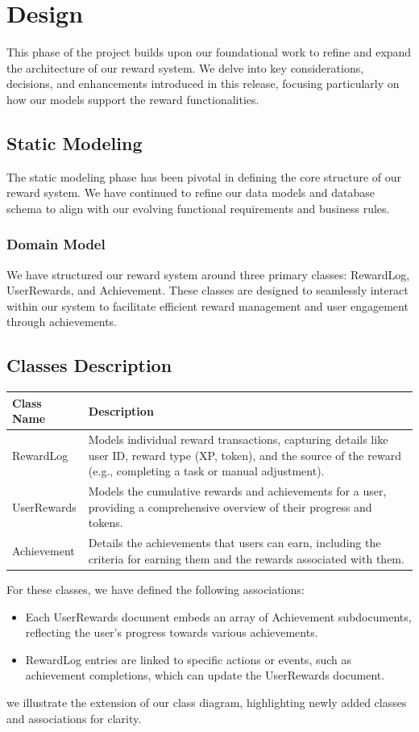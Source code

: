 \section{Design}
This phase of the project builds upon our foundational work to refine and expand the architecture of our reward system. We delve into key considerations, decisions, and enhancements introduced in this release, focusing particularly on how our models support the reward functionalities.

\subsection{Static Modeling}
The static modeling phase has been pivotal in defining the core structure of our reward system. We have continued to refine our data models and database schema to align with our evolving functional requirements and business rules.

\subsubsection{Domain Model}
We have structured our reward system around three primary classes: RewardLog, UserRewards, and Achievement. These classes are designed to seamlessly interact within our system to facilitate efficient reward management and user engagement through achievements.

\subsection{Classes Description}
\begin{tabular}{|l|p{10cm}|}
\hline
\textbf{Class Name} & \textbf{Description} \\
\hline
RewardLog & Models individual reward transactions, capturing details like user ID, reward type (XP, token), and the source of the reward (e.g., completing a task or manual adjustment). \\
\hline
UserRewards & Models the cumulative rewards and achievements for a user, providing a comprehensive overview of their progress and tokens. \\
\hline
Achievement & Details the achievements that users can earn, including the criteria for earning them and the rewards associated with them. \\
\hline
\end{tabular}

For these classes, we have defined the following associations:
\begin{itemize}
    \item Each UserRewards document embeds an array of Achievement subdocuments, reflecting the user's progress towards various achievements.
    \item RewardLog entries are linked to specific actions or events, such as achievement completions, which can update the UserRewards document.
\end{itemize}
 we illustrate the extension of our class diagram, highlighting newly added classes and associations for clarity.

